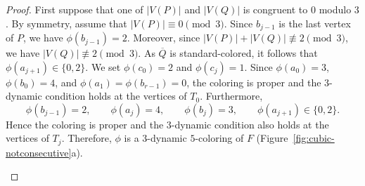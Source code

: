 \documentclass[10pt,a4paper]{article}
\providecommand{\tikzsetnextfilename}[1]{}
\theoremstyle{case}
\numberwithin{subcase}{case}
\begin{document}
\begin{proof}
First suppose that one of $|V(P)|$ and $|V(Q)|$ is congruent to $0$
modulo $3$. By symmetry, assume that $|V(P)|\equiv0\pmod3$.
Since $b_{j-1}$ is the last vertex of $P$, we have
$\phi(b_{j-1})=2$. Moreover, since
$|V(P)|+|V(Q)|\not\equiv2\pmod3$, we have
$|V(Q)|\not\equiv2\pmod3$. As $\overline{Q}$ is standard-colored,
it follows that $\phi(a_{j+1})\in\{0,2\}$.
We set $\phi(c_0)=2$ and $\phi(c_j)=1$. Since
$\phi(a_0)=3$, $\phi(b_0)=4$, and
$\phi(a_1)=\phi(b_{r-1})=0$, the coloring is proper and the
$3$-dynamic condition holds at the vertices of $T_0$.
Furthermore,
\[
\phi(b_{j-1})=2,\qquad
\phi(a_j)=4,\qquad
\phi(b_j)=3,\qquad
\phi(a_{j+1})\in\{0,2\}.
\]
Hence the coloring is proper and the $3$-dynamic condition also holds
at the vertices of $T_j$. Therefore, $\phi$ is a $3$-dynamic
$5$-coloring of $F$ (Figure~\ref{fig:cubic-notconsecutive}a).


\begin{figure}[H]
    \centering

    \begin{subfigure}{0.48\textwidth}
        \centering
\tikzsetnextfilename{fig-cubic-P0mod3}
\end{subfigure}
\end{figure}
\end{proof}
\end{document}
